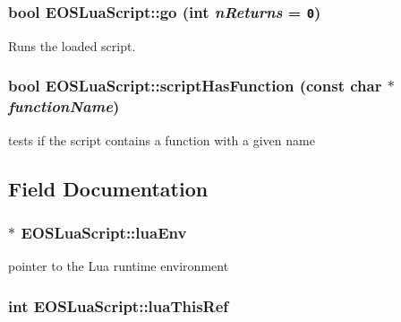 \hypertarget{classEOSLuaScript_6d24519473b5a583d3ce89252a11e0ce}{
\subsubsection[{go}]{\setlength{\rightskip}{0pt plus 5cm}bool EOSLuaScript::go (int {\em nReturns} = {\tt 0})}}
\label{classEOSLuaScript_6d24519473b5a583d3ce89252a11e0ce}


Runs the loaded script. 

\hypertarget{classEOSLuaScript_466d88c9afeec258536cd069b811f325}{
\subsubsection[{scriptHasFunction}]{\setlength{\rightskip}{0pt plus 5cm}bool EOSLuaScript::scriptHasFunction (const char $\ast$ {\em functionName})}}
\label{classEOSLuaScript_466d88c9afeec258536cd069b811f325}


tests if the script contains a function with a given name 



\subsection{Field Documentation}
\hypertarget{classEOSLuaScript_4417b00b43ee03bc2120f76a3bb12d07}{
\subsubsection[{luaEnv}]{$\ast$ {\bf EOSLuaScript::luaEnv}}}
\label{classEOSLuaScript_4417b00b43ee03bc2120f76a3bb12d07}


pointer to the Lua runtime environment 

\hypertarget{classEOSLuaScript_6ce277b904132a14459a929d6d8a5903}{
\subsubsection[{luaThisRef}]{\setlength{\rightskip}{0pt plus 5cm}int {\bf EOSLuaScript::luaThisRef}}}
\label{classEOSLuaScript_6ce277b904132a14459a929d6d8a5903}


